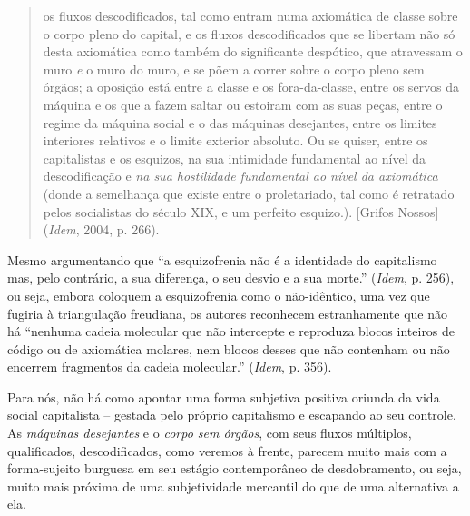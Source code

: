 \begin{quote}
os fluxos descodificados, tal como entram numa axiomática de classe
sobre o corpo pleno do capital, e os fluxos descodificados que se
libertam não só desta axiomática como também do significante despótico,
que atravessam o muro \emph{e} o muro do muro, e se põem a correr sobre
o corpo pleno sem órgãos; a oposição está entre a classe e os
fora-da-classe, entre os servos da máquina e os que a fazem saltar ou
estoiram com as suas peças, entre o regime da máquina social e o das
máquinas desejantes, entre os limites interiores relativos e o limite
exterior absoluto. Ou se quiser, entre os capitalistas e os esquizos, na
sua intimidade fundamental ao nível da descodificação e \emph{na sua
hostilidade fundamental ao nível da axiomática} (donde a semelhança que
existe entre o proletariado, tal como é retratado pelos socialistas do
século XIX, e um perfeito esquizo.). {[}Grifos Nossos{]} (\emph{Idem},
2004, p. 266).
\end{quote}

Mesmo argumentando que ``a esquizofrenia não é a identidade do
capitalismo mas, pelo contrário, a sua diferença, o seu desvio e a sua
morte.'' (\emph{Idem}, p. 256), ou seja, embora coloquem a esquizofrenia
como o não-idêntico, uma vez que fugiria à triangulação freudiana, os
autores reconhecem estranhamente que não há ``nenhuma cadeia molecular
que não intercepte e reproduza blocos inteiros de código ou de
axiomática molares, nem blocos desses que não contenham ou não encerrem
fragmentos da cadeia molecular.'' (\emph{Idem}, p. 356).

Para nós, não há como apontar uma forma subjetiva positiva oriunda da
vida social capitalista -- gestada pelo próprio capitalismo e escapando
ao seu controle. As \emph{máquinas desejantes} e o \emph{corpo sem
órgãos}, com seus fluxos múltiplos, qualificados, descodificados, como
veremos à frente, parecem muito mais com a forma-sujeito burguesa em seu
estágio contemporâneo de desdobramento, ou seja, muito mais próxima de
uma subjetividade mercantil do que de uma alternativa a ela.

